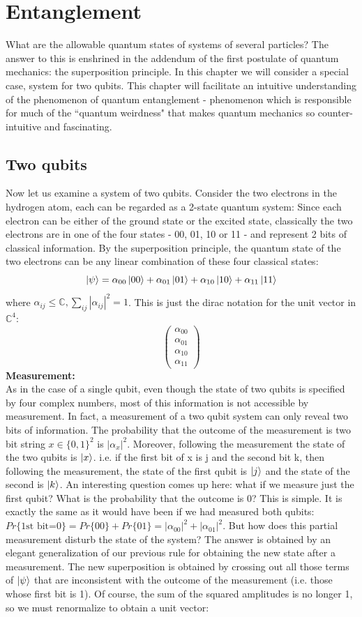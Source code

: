 \chapter{Entanglement}
What are the allowable quantum states of systems of several particles? The answer to this is enshrined in the addendum of the first postulate of quantum mechanics: the superposition principle. In this chapter we will consider a special case, system for two qubits. This chapter will facilitate an intuitive understanding of the phenomenon of quantum entanglement - phenomenon which is responsible for much of the ``quantum weirdness" that makes quantum mechanics so counter-intuitive and fascinating.

\section{Two qubits}
Now let us examine a system of two qubits. Consider the two electrons in the hydrogen atom, each can be regarded as a 2-state quantum system: Since each electron can be either of the ground state or the excited state, classically the two electrons are in one of the four states - 00, 01, 10 or 11 - and represent 2 bits of classical information. By the superposition principle, the quantum state of the two electrons can be any linear combination of these four classical states:
\[
    \ket{\psi}=\alpha_{00}\ket{00}+\alpha_{01}\ket{01}+\alpha_{10}\ket{10}+\alpha_{11}\ket{11}
\]
where $\alpha_{ij}\leq \mathbb{C}, \sum_{ij}|\alpha_{ij}|^2=1$. This is just the dirac notation for the unit vector in $\mathbb{C}^4$:
\[
\begin{pmatrix} \alpha_{00}\\\alpha_{01}\\ \alpha_{10} \\ \alpha_{11} \end{pmatrix}
\]
\textbf{Measurement: }\\
As in the case of a single qubit, even though the state of two qubits is specified by four complex numbers, most of this information is not accessible by measurement. In fact, a measurement of a two qubit system can only reveal two bits of information. The probability that the outcome of the measurement is two bit string $x \in \{0,1\}^2$ is $|\alpha_x|^2$. Moreover, following the measurement the state of the two qubits is $\ket{x}$. i.e. if the first bit of x is j and the second
bit k, then following the measurement, the state of the first qubit is $\ket{j}$ and
the state of the second is $\ket{k}$. An interesting question comes up here: what if we measure just the first qubit? What is the probability that the outcome is 0? This is simple. It is exactly the same as it would have been if we had measured both qubits:$Pr\{\text{1st bit=0}\}=Pr\{00\}+Pr\{01\}=|\alpha_{00}|^2+|\alpha_{01}|^2$. But how does this partial measurement disturb the state of the system? The answer is obtained by an elegant generalization of our previous rule for obtaining the new state after a measurement. The new superposition is obtained by crossing out all those terms of $\ket{\psi}$ that are inconsistent with the outcome of the measurement (i.e. those whose first bit is 1). Of course, the sum of the squared amplitudes is no longer 1, so we must renormalize to obtain a unit vector:

